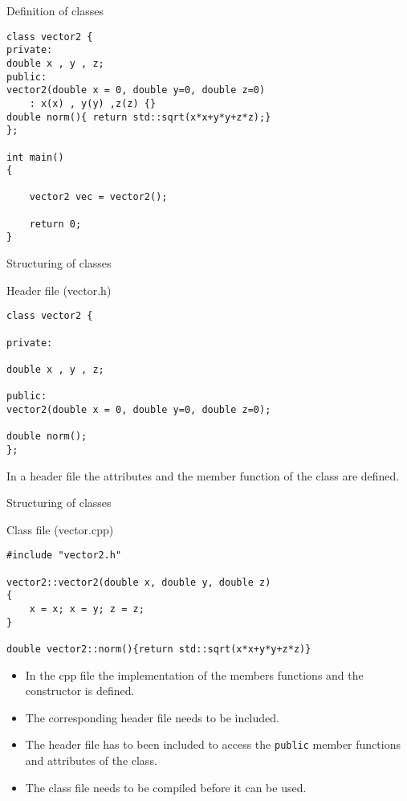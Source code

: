 \documentclass[\classoption]{beamer}
\begin{document}
\begin{frame}[fragile]{Definition of classes}
\begin{lstlisting}
class vector2 {
private:
double x , y , z;
public:
vector2(double x = 0, double y=0, double z=0)
	: x(x) , y(y) ,z(z) {}
double norm(){ return std::sqrt(x*x+y*y+z*z);}
};

int main()
{
   
    vector2 vec = vector2();

    return 0;
}
\end{lstlisting}
\end{frame}

\begin{frame}[fragile]{Structuring of classes}

\begin{block}{Header file (vector.h)}
\begin{lstlisting}
class vector2 {

private:

double x , y , z;

public:
vector2(double x = 0, double y=0, double z=0);

double norm();
};
\end{lstlisting}
\end{block}
In a header file the attributes and the member function of the class are defined.
\end{frame}


\begin{frame}[fragile]{Structuring of classes}

\begin{block}{Class file (vector.cpp)}
\begin{lstlisting}
#include "vector2.h"

vector2::vector2(double x, double y, double z)
{
    x = x; x = y; z = z;
}

double vector2::norm(){return std::sqrt(x*x+y*y+z*z)}
\end{lstlisting}
\end{block}
\begin{itemize}
\item In the cpp file the implementation of the members functions and the constructor is defined.
\item The corresponding header file needs to be included.
\item The header file has to been included to access the \lstinline|public| member functions and attributes of the class.
\item The class file needs to be compiled before it can be used.
\end{itemize}

\end{frame}
\end{document}

